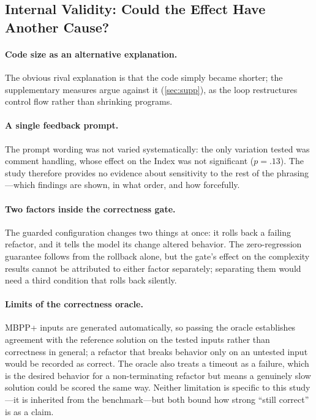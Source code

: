 \subsection{Internal Validity: Could the Effect Have Another Cause?}

\paragraph{Code size as an alternative explanation.} The obvious rival explanation
is that the code simply became shorter; the supplementary measures argue against
it (\cref{sec:supp}), as the loop restructures control flow rather than shrinking
programs.

\paragraph{A single feedback prompt.} The prompt wording was not varied
systematically: the only variation tested was comment handling, whose effect on the
Index was not significant ($p=.13$). The study therefore provides no evidence about
sensitivity to the rest of the phrasing---which findings are shown, in what order,
and how forcefully.

\paragraph{Two factors inside the correctness gate.} The guarded configuration
changes two things at once: it rolls back a failing refactor, and it tells the model
its change altered behavior. The zero-regression guarantee follows from the rollback
alone, but the gate's effect on the complexity results cannot be attributed to
either factor separately; separating them would need a third condition that rolls
back silently.

\paragraph{Limits of the correctness oracle.} MBPP+ inputs are generated
automatically, so passing the oracle establishes agreement with the reference
solution on the tested inputs rather than correctness in general; a refactor that
breaks behavior only on an untested input would be recorded as correct. The oracle
also treats a timeout as a failure, which is the desired behavior for a
non-terminating refactor but means a genuinely slow solution could be scored the
same way. Neither limitation is specific to this study---it is inherited from the
benchmark---but both bound how strong ``still correct'' is as a claim.

